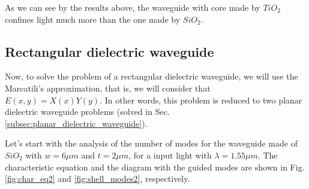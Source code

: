 \documentclass[a4paper,12pt]{article}
\begin{document}
As we can see by the results above, the waveguide with core made by $TiO_2$ confines light much more than the one made by $SiO_2$. 

\subsection{Rectangular dielectric waveguide}
\label{subsec:rectangular_dielectric_waveguide}
    
Now, to solve the problem of a rectangular dielectric waveguide, we will use the Marcatili's approximation, that is, we will consider that $E(x, y) = X(x)Y(y)$. In other words, this problem is reduced to two planar dielectric waveguide problems (solved in Sec. \ref{subsec:planar_dielectric_waveguide}).

Let's start with the analysis of the number of modes for the waveguide made of $SiO_2$ with $w = 6\mu m$ and $t = 2\mu m$, for a input light with $\lambda = 1.55\mu m$. The characteristic equation and the diagram with the guided modes are shown in Fig. \ref{fig:char_eq2} and \ref{fig:shell_modes2}, respectively.
\end{document}
